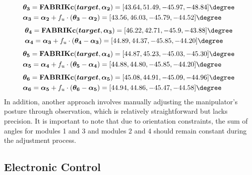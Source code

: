 \vspace{-18mm}
\begin{align}
    &\boldsymbol{\theta_3} = \textbf{FABRIKc}(\boldsymbol{target}, \boldsymbol{\alpha_2}) 
    = [43.64, 51.49, -45.97, -48.84]\degree \nonumber \\
    &\boldsymbol{\alpha_3} = \boldsymbol{\alpha_2} + f_u \cdot (\boldsymbol{\theta_3} - \boldsymbol{\alpha_2}) 
    = [43.56, 46.03, -45.79, -44.52]\degree
    \label{eq:alpha_2_to_3}
\end{align}
\vspace{-18mm}
\begin{align}
    &\boldsymbol{\theta_4} = \textbf{FABRIKc}(\boldsymbol{target}, \boldsymbol{\alpha_3}) 
    = [46.22, 42.71, -45.9, -43.88]\degree \nonumber \\
    &\boldsymbol{\alpha_4} = \boldsymbol{\alpha_3} + f_u \cdot (\boldsymbol{\theta_4} - \boldsymbol{\alpha_3}) 
    = [44.89, 44.37, -45.85, -44.20]\degree
    \label{eq:alpha_3_to_4}
\end{align}
\vspace{-18mm}
\begin{align}
    &\boldsymbol{\theta_5} = \textbf{FABRIKc}(\boldsymbol{target}, \boldsymbol{\alpha_4}) 
    = [44.87, 45.23, -45.03, -45.30]\degree \nonumber \\
    &\boldsymbol{\alpha_5} = \boldsymbol{\alpha_4} + f_u \cdot (\boldsymbol{\theta_5} - \boldsymbol{\alpha_4}) 
    = [44.88, 44.80, -45.85, -44.20]\degree
    \label{eq:alpha_4_to_5}
\end{align}
\vspace{-18mm}
\begin{align}
    &\boldsymbol{\theta_6} = \textbf{FABRIKc}(\boldsymbol{target}, \boldsymbol{\alpha_5}) 
    = [45.08, 44.91, -45.09, -44.96]\degree \nonumber \\
    &\boldsymbol{\alpha_6} = \boldsymbol{\alpha_5} + f_u \cdot (\boldsymbol{\theta_6} - \boldsymbol{\alpha_5}) 
    = [44.94, 44.86, -45.47, -44.58]\degree
    \label{eq:alpha_5_to_6}
\end{align}
\noindent In addition, another approach involves manually adjusting the manipulator's posture through observation, 
which is relatively straightforward but lacks precision. It is important to note that due to orientation constraints, 
the sum of angles for modules 1 and 3 and modules 2 and 4 should remain constant during the adjustment process.
\subsection{Electronic Control}
